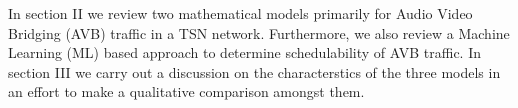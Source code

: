 \documentclass[journal,12pt,twocolumn]{IEEEtran}
\begin{document}
In section II we review two mathematical models primarily for Audio Video Bridging (AVB) traffic in a TSN network. Furthermore, we also review a Machine Learning (ML) based approach to determine schedulability of AVB traffic. In section III we carry out a discussion on the characterstics of the three models in an effort to make a qualitative comparison amongst them.

%
%
\end{document}
